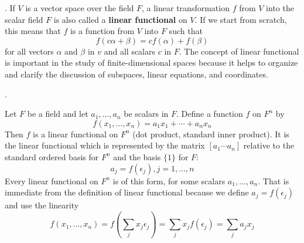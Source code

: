 \documentclass[8pt]{beamer}
\newcommand{\tb}[1]{\textbf{#1}}
\begin{document}
\begin{frame}{.}
    If $V$ is a vector space over the field $F$, a linear transformation $f$ from $V$ into the scalar field $F$ is also called a \tb{linear functional} on $V$.
    If we start from scratch, this means that $f$ is a function from $V$ into $F$ such that
    \[
        f(c \alpha + \beta) = c f(\alpha) + f(\beta)
    \]
    for all vectors $\alpha$ and $\beta$ in $v$ and all scalars $c$ in $F$.
    The concept of linear functional is important in the study of finite-dimensional spaces because it helps to organize and clarify the discussion of subspaces, linear equations, and coordinates.


\end{frame}

\begin{frame}{.}
    \begin{example}
        Let $F$ be a field and let $a_1, \dots, a_n$ be scalars in $F$.
        Define a function $f$ on $F^n$ by
        \[
            f(x_1, \dots, x_n) = a_1 x_1 + \cdots + a_n x_n
        \]
        Then $f$ is a linear functional on $F^n$ (dot product, standard inner product).
        It is the linear functional which is represented by the matrix $[a_1 \cdots a_n]$ relative to the standard ordered basis for $F^n$ and the basis $\{1\}$ for $F$:
        \[
            a_j = f(\epsilon_j), j=1, \dots, n
        \]
        Every linear functional on $F^n$ is of this form, for some scalars $a_1, \dots, a_n$.
        That is immediate from the definition of linear functional because we define $a_j = f(\epsilon_j)$ and use the linearity
        \[
            f(x_1, \dots, x_n) = f\left(\sum_j x_j \epsilon_j \right) =\sum_j x_j f(\epsilon_j) = \sum_j a_j x_j
        \]
    \end{example}
\end{frame}
\end{document}
